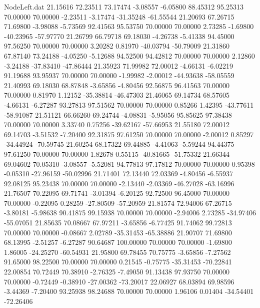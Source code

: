 \begin{filecontents}{NodeLeft.dat}
  21.15616   72.23511   73.17474    -3.08557   -6.05800   88.45312   95.25313   70.00000   70.00000   -2.23511   -3.17474  -31.35248  -61.55544
  21.20693   67.26715   71.69800    -3.98088   -5.73569   92.41563   95.53750   70.00000   70.00000    2.73285   -1.69800  -40.23965  -57.97770
  21.26799   66.79718   69.18030    -4.26738   -5.41338   94.45000   97.56250   70.00000   70.00000    3.20282    0.81970  -40.03794  -50.79009
  21.31860   67.87140   73.24188    -4.05250   -5.12688   94.52500   94.42812   70.00000   70.00000    2.12860   -3.24188  -37.83410  -47.86444
  21.35923   71.99982   72.00012    -4.66131   -6.02219   91.19688   93.95937   70.00000   70.00000   -1.99982   -2.00012  -44.93638  -58.05559
  21.40993   69.18030   68.87848    -3.65856   -4.80456   92.56875   96.41563   70.00000   70.00000    0.81970    1.12152  -35.38814  -46.47303
  21.46065   69.14734   68.57605    -4.66131   -6.27287   93.27813   97.51562   70.00000   70.00000    0.85266    1.42395  -43.77611  -58.91087
  21.51121   66.66260   69.24744    -4.08831   -5.95056   95.85625   97.38438   70.00000   70.00000    3.33740    0.75256  -39.62167  -57.66953
  21.55180   72.00012   69.14703    -3.51532   -7.20400   92.31875   97.61250   70.00000   70.00000   -2.00012    0.85297  -34.44924  -70.59745
  21.60254   68.17322   69.44885    -4.41063   -5.59244   94.44375   97.61250   70.00000   70.00000    1.82678    0.55115  -40.81665  -51.75332
  21.66344   69.04602   70.05310    -3.08557   -5.52081   94.77813   97.17812   70.00000   70.00000    0.95398   -0.05310  -27.96159  -50.02996
  21.71401   72.13440   72.03369    -4.80456   -6.55937   92.08125   95.23438   70.00000   70.00000   -2.13440   -2.03369  -46.27028  -63.16996
  21.76507   70.22095   69.71741    -3.01394   -6.20125   92.72500   96.45000   70.00000   70.00000   -0.22095    0.28259  -27.80509  -57.20959
  21.81574   72.94006   67.26715    -3.80181   -5.98638   90.41875   99.15938   70.00000   70.00000   -2.94006    2.73285  -34.97406  -55.07051
  21.85635   70.08667   67.97211    -3.65856   -6.77425   91.74062   99.72813   70.00000   70.00000   -0.08667    2.02789  -35.31453  -65.38886
  21.90707   71.69800   68.13995    -2.51257   -6.27287   90.64687  100.00000   70.00000   70.00000   -1.69800    1.86005  -24.25270  -60.54931
  21.95800   69.78455   70.75775    -3.65856   -7.27562   91.65000   98.22500   70.00000   70.00000    0.21545   -0.75775  -35.31453  -70.22841
  22.00854   70.72449   70.38910    -2.76325   -7.49050   91.13438   97.93750   70.00000   70.00000   -0.72449   -0.38910  -27.00362  -73.20017
  22.06927   68.03894   69.98596    -3.44369   -7.20400   93.25938   98.24688   70.00000   70.00000    1.96106    0.01404  -34.54401  -72.26406

\end{filecontents}
